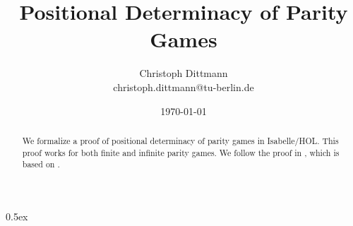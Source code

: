 \documentclass[11pt,a4paper]{scrartcl}
\begin{document}
\title{Positional Determinacy of Parity Games}
\author{Christoph Dittmann\\christoph.dittmann@tu-berlin.de}
\date{\today}
\maketitle

\begin{abstract}
  We formalize a proof of positional determinacy of parity games in
  Isabelle/HOL.  This proof works for both finite and infinite parity
  games.  We follow the proof in \cite{kreutzer2015}, which is based
  on \cite{zielonka1998}.
\end{abstract}

\tableofcontents
\newpage

\parindent 0pt\parskip 0.5ex



\clearpage
{}
{}


\end{document}
